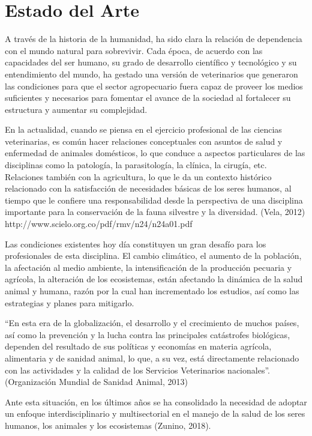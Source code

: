
\chapter{Estado del Arte}\label{chapter:state-of-the-art}
A través de la historia de la humanidad, ha sido clara la relación de dependencia con el mundo natural para sobrevivir. Cada época, de acuerdo con las capacidades del ser humano, su grado de desarrollo científico y tecnológico y su entendimiento del mundo, ha gestado una versión de veterinarios que generaron las condiciones para que el sector agropecuario fuera capaz de proveer los medios suficientes y necesarios para fomentar el avance de la sociedad al fortalecer su estructura y aumentar su complejidad. 

En la actualidad, cuando se piensa en el ejercicio profesional de las ciencias veterinarias, es común hacer relaciones conceptuales con asuntos de salud y enfermedad de animales domésticos, lo que conduce a aspectos particulares de las disciplinas como la patología, la parasitología, la clínica, la cirugía, etc. Relaciones también con la agricultura, lo que le da un contexto histórico relacionado con la satisfacción de necesidades básicas de los seres humanos, al tiempo que le confiere una responsabilidad desde la perspectiva de una disciplina importante para la conservación de la fauna silvestre y la diversidad. 
(Vela, 2012) 
 http://www.scielo.org.co/pdf/rmv/n24/n24a01.pdf  

Las condiciones existentes hoy día constituyen un gran desafío para los profesionales de esta disciplina.  El cambio climático, el aumento de la población, la afectación al medio ambiente, la intensificación de la producción pecuaria y agrícola, la alteración de los ecosistemas, están afectando la dinámica de la salud animal y humana, razón por la cual han incrementado los estudios, así como las estrategias y planes para mitigarlo. 

“En esta era de la globalización, el desarrollo y el crecimiento de muchos países, así como la prevención y la lucha contra las principales catástrofes biológicas, dependen del resultado de sus políticas y economías en materia agrícola, alimentaria y de sanidad animal, lo que, a su vez, está directamente relacionado con las actividades y la calidad de los Servicios Veterinarios nacionales”. (Organización Mundial de Sanidad Animal, 2013) 

Ante esta situación, en los últimos años se ha consolidado la necesidad de adoptar un enfoque interdisciplinario y multisectorial en el manejo de la salud de los seres humanos, los animales y los ecosistemas (Zunino, 2018). 

